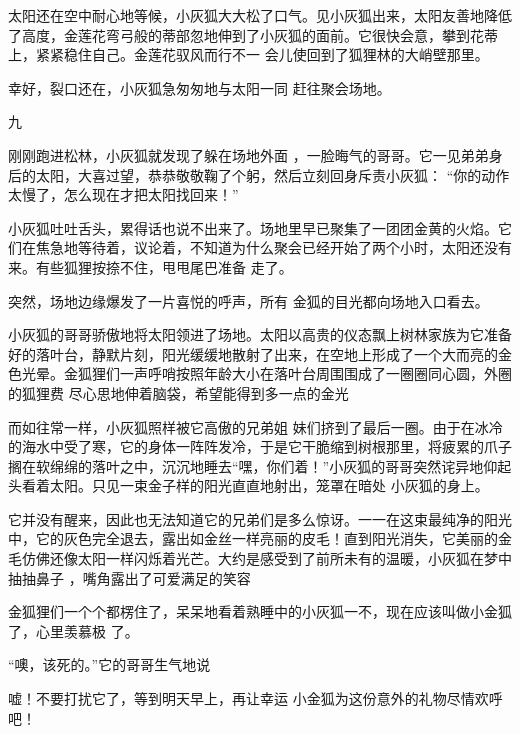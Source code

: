 \documentclass{article}
\begin{document}
太阳还在空中耐心地等候，小灰狐大大松了口气。见小灰狐出来，太阳友善地降低了高度，金莲花弯弓般的蒂部忽地伸到了小灰狐的面前。它很快会意，攀到花蒂上，紧紧稳住自己。金莲花驭风而行不一
会儿使回到了狐狸林的大峭壁那里。 

幸好，裂口还在，小灰狐急匆匆地与太阳一同
赶往聚会场地。 


九 

刚刚跑进松林，小灰狐就发现了躲在场地外面
\newpage
，一脸晦气的哥哥。它一见弟弟身后的太阳，大喜过望，恭恭敬敬鞠了个躬，然后立刻回身斥责小灰狐：
“你的动作太慢了，怎么现在才把太阳找回来！” 

小灰狐吐吐舌头，累得话也说不出来了。场地里早已聚集了一团团金黄的火焰。它们在焦急地等待着，议论着，不知道为什么聚会已经开始了两个小时，太阳还没有来。有些狐狸按捺不住，甩甩尾巴准备
走了。 

突然，场地边缘爆发了一片喜悦的呼声，所有
金狐的目光都向场地入口看去。 

小灰狐的哥哥骄傲地将太阳领进了场地。太阳以高贵的仪态飘上树林家族为它准备好的落叶台，静默片刻，阳光缓缓地散射了出来，在空地上形成了一个大而亮的金色光晕。金狐狸们一声呼哨按照年龄大小在落叶台周围围成了一圈圈同心圆，外圈的狐狸费
尽心思地伸着脑袋，希望能得到多一点的金光 

而如往常一样，小灰狐照样被它高傲的兄弟姐
\newpage
妹们挤到了最后一圈。由于在冰冷的海水中受了寒，它的身体一阵阵发冷，于是它干脆缩到树根那里，将疲累的爪子搁在软绵绵的落叶之中，沉沉地睡去“嘿，你们着！”小灰狐的哥哥突然诧异地仰起头看着太阳。只见一束金子样的阳光直直地射出，笼罩在暗处
小灰狐的身上。 

它并没有醒来，因此也无法知道它的兄弟们是多么惊讶。一一在这束最纯净的阳光中，它的灰色完全退去，露出如金丝一样亮丽的皮毛！直到阳光消失，它美丽的金毛仿佛还像太阳一样闪烁着光芒。大约是感受到了前所未有的温暖，小灰狐在梦中抽抽鼻子
，嘴角露出了可爱满足的笑容 

金狐狸们一个个都楞住了，呆呆地看着熟睡中的小灰狐一不，现在应该叫做小金狐了，心里羡慕极
了。 


“噢，该死的。”它的哥哥生气地说 

嘘！不要打扰它了，等到明天早上，再让幸运
\newpage
小金狐为这份意外的礼物尽情欢呼吧！
\end{document}
